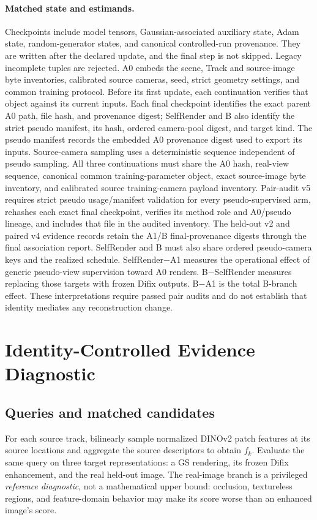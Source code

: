 \documentclass[10pt,twocolumn,letterpaper]{article}
\begin{document}
\paragraph{Matched state and estimands.} Checkpoints include model tensors, Gaussian-associated auxiliary state, Adam state, random-generator states, and canonical controlled-run provenance. They are written after the declared update, and the final step is not skipped. Legacy incomplete tuples are rejected. A0 embeds the scene, Track and source-image byte inventories, calibrated source cameras, seed, strict geometry settings, and common training protocol. Before its first update, each continuation verifies that object against its current inputs. Each final checkpoint identifies the exact parent A0 path, file hash, and provenance digest; SelfRender and B also identify the strict pseudo manifest, its hash, ordered camera-pool digest, and target kind. The pseudo manifest records the embedded A0 provenance digest used to export its inputs. Source-camera sampling uses a deterministic sequence independent of pseudo sampling. All three continuations must share the A0 hash, real-view sequence, canonical common training-parameter object, exact source-image byte inventory, and calibrated source training-camera payload inventory. Pair-audit v5 requires strict pseudo usage/manifest validation for every pseudo-supervised arm, rehashes each exact final checkpoint, verifies its method role and A0/pseudo lineage, and includes that file in the audited inventory. The held-out v2 and paired v4 evidence records retain the A1/B final-provenance digests through the final association report. SelfRender and B must also share ordered pseudo-camera keys and the realized schedule. SelfRender$-$A1 measures the operational effect of generic pseudo-view supervision toward A0 renders. B$-$SelfRender measures replacing those targets with frozen Difix outputs. B$-$A1 is the total B-branch effect. These interpretations require passed pair audits and do not establish that identity mediates any reconstruction change.

\section{Identity-Controlled Evidence Diagnostic}
\subsection{Queries and matched candidates}
For each source track, bilinearly sample normalized DINOv2 patch features at its source locations and aggregate the source descriptors to obtain $f_k$. Evaluate the same query on three target representations: a GS rendering, its frozen Difix enhancement, and the real held-out image. The real-image branch is a privileged \emph{reference diagnostic}, not a mathematical upper bound: occlusion, textureless regions, and feature-domain behavior may make its score worse than an enhanced image's score.
\end{document}
